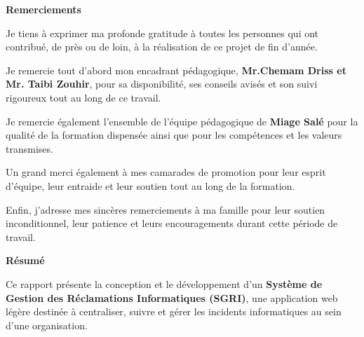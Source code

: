 \documentclass[12pt,a4paper,oneside]{report}
\begin{document}
\begin{center}
\Huge\bfseries\color{darkbg} Remerciements
\vspace{1.5cm}

\normalsize\normalfont
Je tiens à exprimer ma profonde gratitude à toutes les personnes qui ont contribué, de près ou de loin, à la réalisation de ce projet de fin d'année.

\vspace{0.6cm}

Je remercie tout d'abord mon encadrant pédagogique, \textbf{Mr.Chemam Driss et Mr. Taibi Zouhir}, pour sa disponibilité, ses conseils avisés et son suivi rigoureux tout au long de ce travail.

\vspace{0.6cm}

Je remercie également l'ensemble de l'équipe pédagogique de \textbf{Miage Salé} pour la qualité de la formation dispensée ainsi que pour les compétences et les valeurs transmises.

\vspace{0.6cm}

Un grand merci également à mes camarades de promotion pour leur esprit d'équipe, leur entraide et leur soutien tout au long de la formation.

\vspace{0.6cm}

Enfin, j'adresse mes sincères remerciements à ma famille pour leur soutien inconditionnel, leur patience et leurs encouragements durant cette période de travail.
\end{center}

\vspace*{\fill}

\clearpage
{}
{}
\vspace*{\fill}

\begin{center}
\Huge\bfseries\color{darkbg} Résumé
\vspace{1.5cm}
\end{center}

\normalsize\normalfont
\justifying

Ce rapport présente la conception et le développement d'un \textbf{Système de Gestion des Réclamations Informatiques (SGRI)}, une application web légère destinée à centraliser, suivre et gérer les incidents informatiques au sein d'une organisation.
\end{document}
